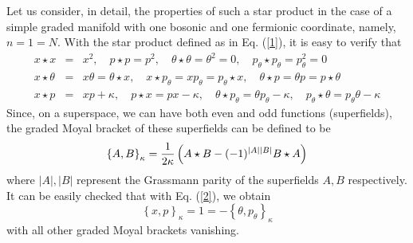 \documentclass[a4paper,11pt]{article}
\begin{document}
Let us consider, in detail, the properties of such a star product in
the case of a simple graded manifold with one bosonic and one
fermionic coordinate, namely, $n=1=N$. With the star product defined as in
Eq. (\ref{1}), it is easy to verify that
\begin{eqnarray}
x\star x & = & x^{2},\quad p\star p = p^{2},\quad \theta\star \theta =
\theta^{2} = 0,\quad p_{\theta}\star p_{\theta} = p_{\theta}^{2} =
0\nonumber\\
x\star \theta & = & x\theta = \theta\star x,\quad x\star p_{\theta} =
xp_{\theta} = p_{\theta}\star x,\quad \theta\star p = \theta p =
p\star \theta\nonumber\\
x\star p & = & xp + \kappa,\quad p\star x = px - \kappa,\quad \theta\star
p_{\theta} = \theta p_{\theta} - \kappa,\quad p_{\theta}\star \theta =
p_{\theta}\theta - \kappa
\end{eqnarray}
Since, on a superspace, we can have both even and odd functions
(superfields), the graded Moyal bracket of these superfields can be
defined to be
\begin{equation}
\left\{A,B\right\}_{\kappa} = {1\over 2\kappa} \left(A\star B -
(-1)^{|A||B|} B\star A\right)\label{2}
\end{equation}
where $|A|,|B|$ represent the Grassmann parity of the superfields
$A,B$ respectively. It can be easily checked that with Eq. (\ref{2}),
we obtain
\begin{equation}
\left\{x,p\right\}_{\kappa} = 1 = -
\left\{\theta,p_{\theta}\right\}_{\kappa}\label{3}
\end{equation}
with all other graded Moyal brackets vanishing. 
\end{document}
